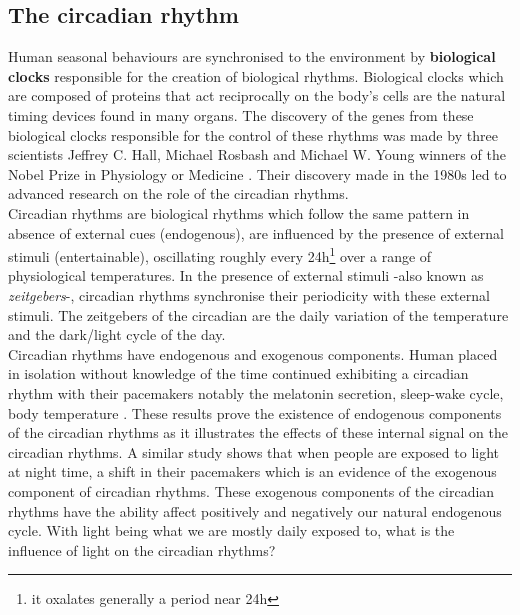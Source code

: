 \subsection{The circadian rhythm}
Human seasonal behaviours are synchronised to the environment by \textbf{biological clocks} responsible for the creation of biological rhythms. Biological clocks which are composed of proteins that act reciprocally on the body's cells are the natural timing devices found in many organs. The discovery of the genes from these biological clocks responsible for the control of these rhythms was made by three scientists Jeffrey  C.  Hall,  Michael  Rosbash and Michael W. Young winners of the Nobel Prize in Physiology or Medicine \cite{sc2017}. Their discovery made in the 1980s led to advanced research on the role of the circadian rhythms.\\
Circadian rhythms are biological rhythms which follow the same pattern in absence of external cues (endogenous), are influenced by the presence of external stimuli (entertainable), oscillating roughly every 24h\footnote{it oxalates generally a period near 24h} over a range of physiological temperatures. In the presence of external stimuli -also known as \textit{zeitgebers}-, circadian rhythms synchronise their periodicity with these external stimuli. The zeitgebers of the circadian are the daily variation of the temperature and the dark/light cycle of the day.\\
Circadian rhythms have endogenous and exogenous components. Human placed in isolation without knowledge of the time continued exhibiting a circadian rhythm with their pacemakers notably the melatonin secretion, sleep-wake cycle, body temperature \cite{in1996}. These results prove the existence of endogenous components of the circadian rhythms as it illustrates the effects of these internal signal on the circadian rhythms. A similar study shows that when people are exposed to light at night time, a shift in their pacemakers \cite{ea2004} which is an evidence of the exogenous component of circadian rhythms. These exogenous components of the circadian rhythms have the ability affect positively and negatively our natural endogenous cycle. With light being what we are mostly daily exposed to, what is the influence of light on the circadian rhythms? 

